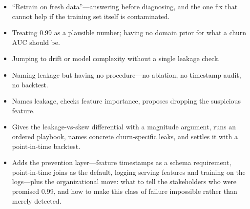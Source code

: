 \begin{interviewq}
\redflags
\begin{itemize}
    \item ``Retrain on fresh data''---answering before diagnosing, and the one fix that cannot help if the training set itself is contaminated.
    \item Treating 0.99 as a plausible number; having no domain prior for what a churn AUC should be.
    \item Jumping to drift or model complexity without a single leakage check.
    \item Naming leakage but having no procedure---no ablation, no timestamp audit, no backtest.
\end{itemize}


\goodgreat
\begin{itemize}
    \item {} Names leakage, checks feature importance, proposes dropping the suspicious feature.
    \item {} Gives the leakage-vs-skew differential with a magnitude argument, runs an ordered playbook, names concrete churn-specific leaks, and settles it with a point-in-time backtest.
    \item {} Adds the prevention layer---feature timestamps as a schema requirement, point-in-time joins as the default, logging serving features and training on the logs---plus the organizational move: what to tell the stakeholders who were promised 0.99, and how to make this class of failure impossible rather than merely detected.
\end{itemize}

\end{interviewq}

